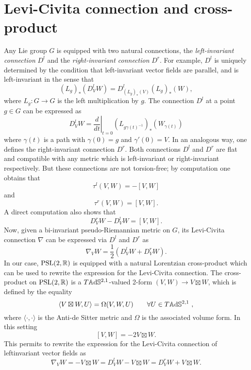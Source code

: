 \section{Levi-Civita connection and cross-product}
Any Lie group $G$ is equipped with two natural connections, the \textit{left-invariant connection} $D^l$ and the \textit{right-invariant connection} $D^r$. For example, $D^l$ is uniquely determined by the condition that left-invariant vector fields are parallel, and is left-invariant in the sense that
\[
    (L_g)_*(D^l_V W) = D^l_{(L_g)_*(V)} (L_g)_*(W),
\]
where $L_g :G \to G$ is the left multiplication by $g$. The connection $D^l$ at a point $g\in G$ can be expressed as
\[
    D^l_V W = \left. \frac{d}{dt} \right|_{t=0} (L_{g \gamma(t)^{-1}})_* (W_{\gamma(t)})
\]
where $\gamma(t)$ is a path with $\gamma(0) = g$ and $\gamma'(0) = V$.
In an analogous way, one defines the right-invariant connection $D^r$. Both connections $D^l$ and $D^r$ are flat and compatible with any metric which is left-invariant or right-invariant respectively. But these connections are not torsion-free; by computation one obtains that
\[
    \tau^l (V,W) = - \left[ V,W \right]
\]
and
\[
    \tau^r (V,W) = \left[ V,W \right].
\]
A direct computation also shows that
\[
    D^r_V W - D^l_V W = \left[ V,W \right].
\]
Now, given a bi-invariant pseudo-Riemannian metric on $G$, its Levi-Civita connection $\nabla$ can be expressed via $D^l$ and $D^r$ as 
\[
    \nabla_V W = \frac{1}{2} (D^l_V W + D^r_V W).
\]
In our case, $\text{PSL}(2,\mathbb{R})$ is equipped with a natural Lorentzian cross-product which can be used to rewrite the expression for the Levi-Civita connection. The cross-product on $\text{PSL}(2,\mathbb{R})$ is a $T \mathbb{A}\mathrm{d}\mathbb{S}^{2,1}$-valued 2-form $(V,W) \to V \boxtimes W$, which is defined by the equality
\[
    \langle V \boxtimes W , U \rangle = \Omega(V,W,U) \qquad \forall U \in T\A^{2,1} \ ,
\]
where $\langle \cdot, \cdot \rangle$ is the Anti-de Sitter metric and $\Omega$ is the associated volume form. In this setting
\[
    \left[ V,W \right] = -2 V \boxtimes W.
\]
This permits to rewrite the expression for the Levi-Civita connection of leftinvariant vector fields as
\[
    \nabla_V W = - V \boxtimes W = D^l_V W - V \boxtimes W = D^r_V W + V \boxtimes W.
\]
